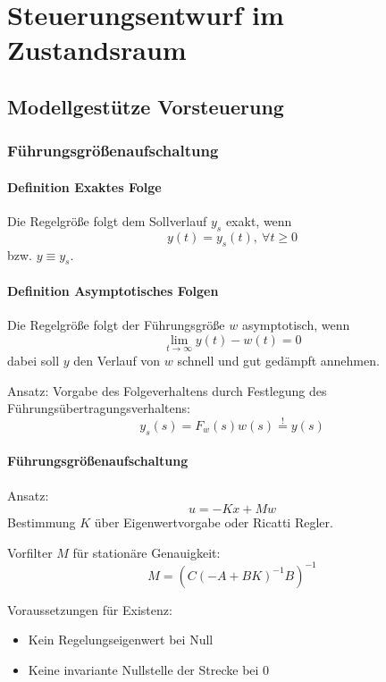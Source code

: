 \chapter{Steuerungsentwurf im Zustandsraum}
\section{Modellgestütze Vorsteuerung}
\subsection{Führungsgrößenaufschaltung}
\subsubsection{Definition Exaktes Folge}
Die Regelgröße folgt dem Sollverlauf $y_s$ exakt, wenn
\begin{equation}
    y(t) = y_s(t),\ \forall t \geq 0
\end{equation}
bzw. $y \equiv y_s$.

\subsubsection{Definition Asymptotisches Folgen}
Die Regelgröße folgt der Führungsgröße $w$ asymptotisch, wenn
\begin{equation}
    \lim_{t \to \infty} y(t) - w(t) = 0
\end{equation}
dabei soll $y$ den Verlauf von $w$ schnell und gut gedämpft annehmen.

Ansatz: Vorgabe des Folgeverhaltens durch Festlegung des Führungsübertragungsverhaltens:
\begin{equation}
    y_s(s) = F_w(s) w(s) \stackrel{!}{=} y(s)
\end{equation}

\subsubsection{Führungsgrößenaufschaltung}
Ansatz:
\begin{equation}
    u = -K x + M w
\end{equation}
Bestimmung $K$ über Eigenwertvorgabe oder Ricatti Regler.

Vorfilter $M$ für stationäre Genauigkeit:
\begin{equation}
    M = {\left(C{(-A+BK)}^{-1}B\right)}^{-1}
\end{equation}

Voraussetzungen für Existenz:
\begin{itemize}
    \item Kein Regelungseigenwert bei Null
    \item Keine invariante Nullstelle der Strecke bei $0$
\end{itemize}

